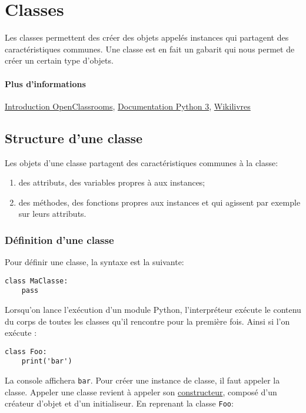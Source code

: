 \section{Classes}

Les classes permettent des créer des objets appelés instances qui partagent des caractéristiques communes. Une classe est en fait un gabarit qui nous permet de créer un certain type d'objets.

\paragraph{Plus d'informations} \href{https://openclassrooms.com/courses/apprenez-a-programmer-en-python/premiere-approche-des-classes}{Introduction OpenClassrooms}, \href{https://docs.python.org/fr/3/tutorial/classes.html}{Documentation Python 3}, \href{https://fr.wikibooks.org/wiki/Programmation_Python/Classes#Définition_d'une_classe_élé mentaire}{Wikilivres}

\subsection{Structure d'une classe}
Les objets d'une classe partagent des caractéristiques communes à la classe:
\begin{enumerate}
    \item des attributs, des variables propres à aux instances;
    \item des méthodes, des fonctions propres aux instances et qui agissent par exemple sur leurs attributs.
\end{enumerate}


\subsubsection{Définition d'une classe}
Pour définir une classe, la syntaxe est la suivante:
\begin{verbatim}
class MaClasse:
    pass
\end{verbatim}

Lorsqu'on lance l'exécution d'un module Python, l'interpréteur exécute le contenu du corps de toutes les classes qu'il rencontre pour la première fois. Ainsi si l'on exécute :

\begin{verbatim}
class Foo:
    print('bar')
\end{verbatim}

La console affichera \texttt{bar}. Pour créer une instance de classe, il faut appeler la classe. Appeler une classe revient à appeler son \hyperref[constructeur]{constructeur}, composé d'un créateur d'objet et d'un initialiseur. En reprenant la classe \texttt{Foo}:

